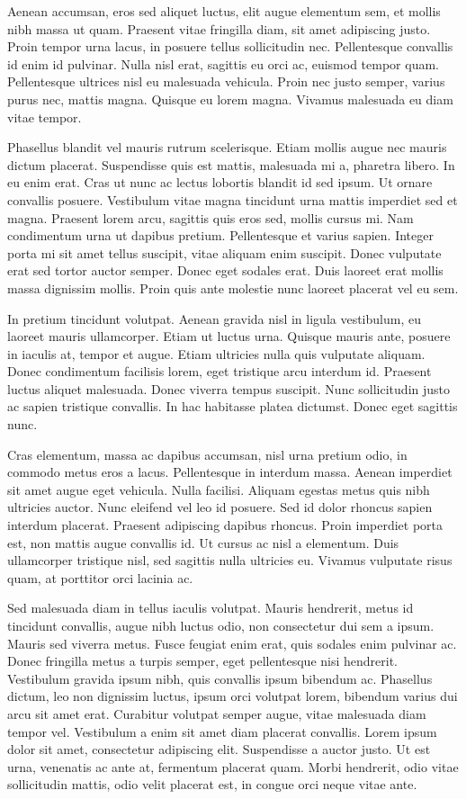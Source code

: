 \documentclass[2pt,a4paper,twoside ]{article}
\begin{document}
\begin{multicols}{2}
Aenean accumsan, eros sed aliquet luctus, elit augue elementum sem, et mollis nibh massa ut quam. Praesent vitae fringilla diam, sit amet adipiscing justo. Proin tempor urna lacus, in posuere tellus sollicitudin nec. Pellentesque convallis id enim id pulvinar. Nulla nisl erat, sagittis eu orci ac, euismod tempor quam. Pellentesque ultrices nisl eu malesuada vehicula. Proin nec justo semper, varius purus nec, mattis magna. Quisque eu lorem magna. Vivamus malesuada eu diam vitae tempor.

Phasellus blandit vel mauris rutrum scelerisque. Etiam mollis augue nec mauris dictum placerat. Suspendisse quis est mattis, malesuada mi a, pharetra libero. In eu enim erat. Cras ut nunc ac lectus lobortis blandit id sed ipsum. Ut ornare convallis posuere. Vestibulum vitae magna tincidunt urna mattis imperdiet sed et magna. Praesent lorem arcu, sagittis quis eros sed, mollis cursus mi. Nam condimentum urna ut dapibus pretium. Pellentesque et varius sapien. Integer porta mi sit amet tellus suscipit, vitae aliquam enim suscipit. Donec vulputate erat sed tortor auctor semper. Donec eget sodales erat. Duis laoreet erat mollis massa dignissim mollis. Proin quis ante molestie nunc laoreet placerat vel eu sem.

In pretium tincidunt volutpat. Aenean gravida nisl in ligula vestibulum, eu laoreet mauris ullamcorper. Etiam ut luctus urna. Quisque mauris ante, posuere in iaculis at, tempor et augue. Etiam ultricies nulla quis vulputate aliquam. Donec condimentum facilisis lorem, eget tristique arcu interdum id. Praesent luctus aliquet malesuada. Donec viverra tempus suscipit. Nunc sollicitudin justo ac sapien tristique convallis. In hac habitasse platea dictumst. Donec eget sagittis nunc.

Cras elementum, massa ac dapibus accumsan, nisl urna pretium odio, in commodo metus eros a lacus. Pellentesque in interdum massa. Aenean imperdiet sit amet augue eget vehicula. Nulla facilisi. Aliquam egestas metus quis nibh ultricies auctor. Nunc eleifend vel leo id posuere. Sed id dolor rhoncus sapien interdum placerat. Praesent adipiscing dapibus rhoncus. Proin imperdiet porta est, non mattis augue convallis id. Ut cursus ac nisl a elementum. Duis ullamcorper tristique nisl, sed sagittis nulla ultricies eu. Vivamus vulputate risus quam, at porttitor orci lacinia ac.

Sed malesuada diam in tellus iaculis volutpat. Mauris hendrerit, metus id tincidunt convallis, augue nibh luctus odio, non consectetur dui sem a ipsum. Mauris sed viverra metus. Fusce feugiat enim erat, quis sodales enim pulvinar ac. Donec fringilla metus a turpis semper, eget pellentesque nisi hendrerit. Vestibulum gravida ipsum nibh, quis convallis ipsum bibendum ac. Phasellus dictum, leo non dignissim luctus, ipsum orci volutpat lorem, bibendum varius dui arcu sit amet erat. Curabitur volutpat semper augue, vitae malesuada diam tempor vel. Vestibulum a enim sit amet diam placerat convallis. Lorem ipsum dolor sit amet, consectetur adipiscing elit. Suspendisse a auctor justo. Ut est urna, venenatis ac ante at, fermentum placerat quam. Morbi hendrerit, odio vitae sollicitudin mattis, odio velit placerat est, in congue orci neque vitae ante.


\end{multicols}
\end{document}
